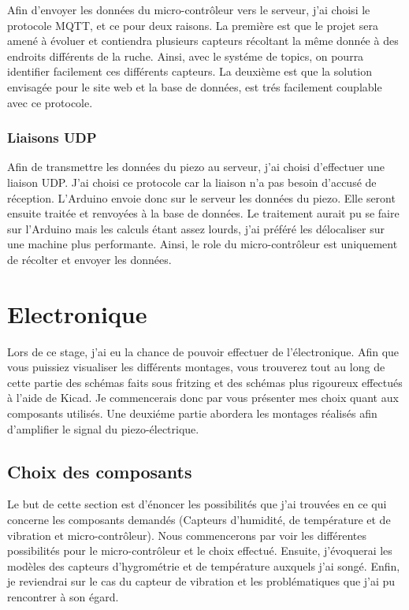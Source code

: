 \documentclass[12pt,french,a4paper]{article}
\begin{document}
Afin d'envoyer les données du micro-contrôleur vers le serveur, j'ai choisi le protocole MQTT, et ce pour deux raisons. La première est que le projet sera amené à évoluer et contiendra plusieurs capteurs récoltant la même donnée à des endroits différents de la ruche. Ainsi, avec le systéme de topics, on pourra identifier facilement ces différents capteurs. La deuxième est que la solution envisagée pour le site web et la base de données, est trés facilement couplable avec ce protocole. 

\subsubsection{Liaisons UDP}
Afin de transmettre les données du piezo au serveur, j'ai choisi d'effectuer une liaison UDP. J'ai choisi ce protocole car la liaison n'a pas besoin d'accusé de réception. L'Arduino envoie donc sur le serveur les données du piezo.
Elle seront ensuite traitée et renvoyées à la base de données. 
Le traitement aurait pu se faire sur l'Arduino mais les calculs étant assez lourds, j'ai préféré les délocaliser sur une machine plus performante. Ainsi, le role du micro-contrôleur est uniquement de récolter et envoyer les données. 

\newpage
\section{Electronique}
Lors de ce stage, j'ai eu la chance de pouvoir effectuer de l'électronique. Afin que vous puissiez visualiser les différents montages, vous trouverez tout au long de cette partie des schémas faits sous fritzing et des schémas plus rigoureux effectués à l'aide de Kicad. Je commencerais donc par vous présenter mes choix quant aux composants utilisés. Une deuxiéme partie abordera les montages réalisés afin d'amplifier le signal du piezo-électrique.
\subsection{Choix des composants}

Le but de cette section est d'énoncer les possibilités que j'ai trouvées en ce qui concerne les composants demandés (Capteurs d'humidité, de température et de vibration et micro-contrôleur). Nous commencerons par voir les différentes possibilités pour le micro-contrôleur et le choix effectué. Ensuite, j'évoquerai les modèles des capteurs d'hygrométrie et de température auxquels j'ai songé. Enfin, je reviendrai sur le cas du capteur de vibration et les problématiques que j'ai pu rencontrer à son égard.
\end{document}
